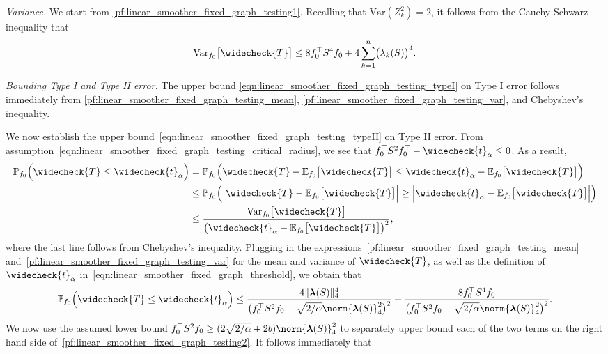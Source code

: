 \documentclass[twoside]{article}
\newcommand{\Var}{\mathrm{Var}}
\newcommand{\1}{\mathbf{1}}
\newcommand{\lambdavec}{\boldsymbol{\lambda}}
\newcommand{\Pbb}{\mathbb{P}}
\newcommand{\Ebb}{\mathbb{E}}
\newcommand{\wc}[1]{\widecheck{#1}}
\theoremstyle{definition}
\theoremstyle{remark}
\begin{document}
\textit{Variance.} We start from \eqref{pf:linear_smoother_fixed_graph_testing1}. Recalling that $\Var(Z_k^2) = 2$, it follows from the Cauchy-Schwarz inequality that
\begin{equation}
\label{pf:linear_smoother_fixed_graph_testing_var}
\Var_{f_0}\bigl[\wc{T}\bigr] \leq 8 f_0^{\top} S^4 f_0 + 4 \sum_{k = 1}^{n} \bigl(\lambda_k(S)\bigr)^4.
\end{equation}

\textit{Bounding Type I and Type II error.} The upper bound \eqref{eqn:linear_smoother_fixed_graph_testing_typeI} on Type I error follows immediately from \eqref{pf:linear_smoother_fixed_graph_testing_mean}, \eqref{pf:linear_smoother_fixed_graph_testing_var}, and Chebyshev's inequality.

We now establish the upper bound~\eqref{eqn:linear_smoother_fixed_graph_testing_typeII} on Type II error. From assumption~\eqref{eqn:linear_smoother_fixed_graph_testing_critical_radius}, we see that $f_0^{\top} S^2 f_0^{\top} - \wc{t}_{\alpha} \leq 0$. As a result,
\begin{align*}
\Pbb_{f_0}\Bigl(\wc{T} \leq \wc{t}_{\alpha}\Bigr) & = \Pbb_{f_0}\Bigl(\wc{T} - \Ebb_{f_0}\bigl[\wc{T}\bigr] \leq \wc{t}_{\alpha} - \Ebb_{f_0}\bigl[\wc{T}\bigr]\Bigr) \\ 
& \leq \Pbb_{f_0}\Bigl(\Bigl|\wc{T} - \Ebb_{f_0}\bigl[\wc{T}\bigr]\Bigr| \geq \Bigl|\wc{t}_{\alpha} - \Ebb_{f_0}\bigl[\wc{T}\bigr]\Bigr|\Bigr) \\ 
& \leq \frac{\Var_{f_0}\bigl[\wc{T}\bigr]}{\bigl(\wc{t}_{\alpha} - \Ebb_{f_0}\bigl[\wc{T}\bigr]\bigr)^2},
\end{align*}
where the last line follows from Chebyshev's inequality. Plugging in the expressions~\eqref{pf:linear_smoother_fixed_graph_testing_mean} and~\eqref{pf:linear_smoother_fixed_graph_testing_var} for the mean and variance of $\wc{T}$, as well as the definition of $\wc{t}_{\alpha}$ in~\eqref{eqn:linear_smoother_fixed_graph_threshold}, we obtain that
\begin{equation}
\label{pf:linear_smoother_fixed_graph_testing2}
\Pbb_{f_0}\Bigl(\wc{T} \leq \wc{t}_{\alpha}\Bigr) \leq \frac{4\|\lambdavec(S)\|_4^4}{\bigl(f_0^{\top}S^2f_0 - \sqrt{2/\alpha} \norm{\lambdavec(S)}_4^2\bigr)^2} + \frac{8f_0^{\top}S^4f_0 }{\bigl(f_0^{\top}S^2f_0 - \sqrt{2/\alpha} \norm{\lambdavec(S)}_4^2\bigr)^2}.
\end{equation}
We now use the assumed lower bound $f_0^{\top} S^2 f_0 \geq (2\sqrt{2/\alpha} + 2b) \norm{\lambdavec(S)}_4^2$ to separately upper bound each of the two terms on the right hand side of~\eqref{pf:linear_smoother_fixed_graph_testing2}. It follows immediately that
\end{document}
